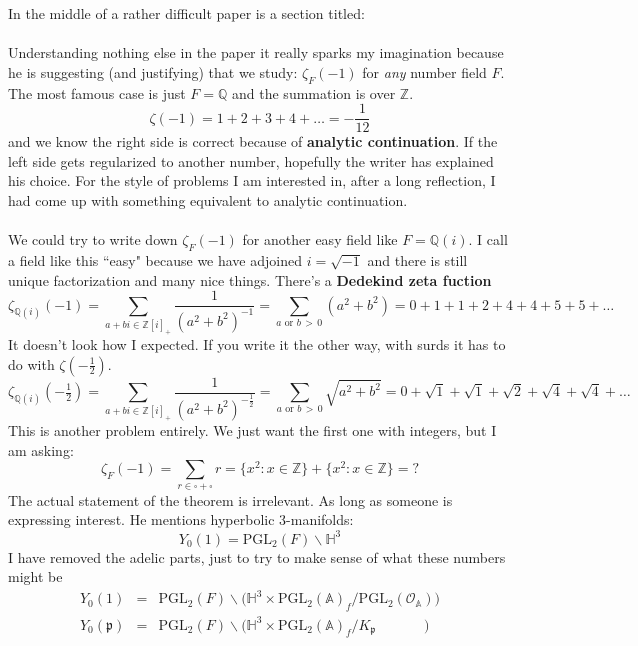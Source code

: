 \documentclass[12pt]{article}
\begin{document}
\noindent In the middle of a rather difficult paper is a section titled:  \\ \\
Understanding nothing else in the paper it really sparks my imagination because he is suggesting (and justifying) that we study: $\zeta_F(-1) $ for \textit{any} number field $F$.   The most famous case is just $F = \mathbb{Q}$ and the summation is over $\mathbb{Z}$.
$$ \zeta(-1) = 1 + 2 + 3 + 4 + \dots = - \frac{1}{12} $$
and we know the right side is correct because of \textbf{analytic continuation}.  If the left side gets regularized to another number, hopefully the writer has explained his choice.  For the style of problems I am interested in, after a long reflection, I had come up with something equivalent to analytic continuation. \\ \\
We could try to write down $\zeta_F(-1)$ for another easy field like $F = \mathbb{Q}(i)$.  I call a field like this ``easy" because we have adjoined $i = \sqrt{-1}$ and there is still unique factorization and many nice things.  There's a \textbf{Dedekind zeta fuction} 
$$ \zeta_{\mathbb{Q}(i)} (-1) = \sum_{a+bi \in \mathbb{Z}[i]_+} \frac{1}{(a^2+b^2)^{-1}} = \sum_{a \text{ or }b \,>\, 0} (a^2 + b^2) = 0 + 1 + 1 + 2 + 4 + 4 + 5 + 5+ \dots  $$
It doesn't look how I expected.  If you write it the other way, with surds it has to do with $\zeta(-\frac{1}{2})$.
$$ \zeta_{\mathbb{Q}(i)} (-\tfrac{1}{2}) = \sum_{a+bi \in \mathbb{Z}[i]_+} \frac{1}{(a^2+b^2)^{-\frac{1}{2}}} = \sum_{a \text{ or }b \,>\, 0} \sqrt{a^2 + b^2} = 0 + \sqrt{1}
+ \sqrt{1}
+ \sqrt{2} 
+ \sqrt{4}
+ \sqrt{4}  + \dots  $$
This is another problem entirely.  We just want the first one with integers, but I am asking:
$$ \zeta_F(-1) = \sum_{r \in \square + \square } r = \big\{ x^2 : x \in \mathbb{Z} \big\} +  \big\{ x^2 : x \in \mathbb{Z} \big\}  = \text{?} $$
The actual statement of the theorem is irrelevant.  As long as someone is expressing interest. He mentions hyperbolic 3-manifolds:
$$ Y_0(1) = \mathrm{PGL}_2(F)  \backslash  \mathbb{H}^3  $$
I have removed the adelic parts, just to try to make sense of what these numbers might be
\begin{eqnarray*}
Y_0(1) &=& \mathrm{PGL}_2(F) \backslash \Big( \mathbb{H}^3 \times \mathrm{PGL}_2(\mathbb{A})_f / \mathrm{PGL}_2(\mathcal{O}_\mathbb{A}) \Big) \\
Y_0(\mathfrak{p}) &=& \mathrm{PGL}_2(F) \backslash \Big( \mathbb{H}^3 \times 
\mathrm{PGL}_2(\mathbb{A})_f / K_\mathfrak{p} \hspace{41pt} \Big) 
\end{eqnarray*}
\end{document}
